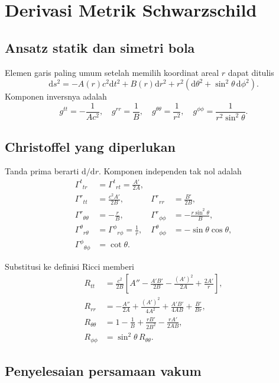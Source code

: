 \documentclass[12pt,a4paper]{report}
\newcommand{\dd}{\mathrm{d}}
\begin{document}
\chapter{Derivasi Metrik Schwarzschild}

\section{Ansatz statik dan simetri bola}

Elemen garis paling umum setelah memilih koordinat areal $r$ dapat ditulis
\[
 \dd s^2=-A(r)c^2\dd t^2+B(r)\dd r^2
 +r^2(\dd\theta^2+\sin^2\theta\,\dd\phi^2).
\]
Komponen inversnya adalah
\[
 g^{tt}=-\frac{1}{A c^2},\quad
 g^{rr}=\frac1B,\quad
 g^{\theta\theta}=\frac1{r^2},\quad
 g^{\phi\phi}=\frac1{r^2\sin^2\theta}.
\]

\section{Christoffel yang diperlukan}

Tanda prima berarti $\dd/\dd r$. Komponen independen tak nol adalah
\begin{align}
 \Gamma^t{}_{tr}&=\Gamma^t{}_{rt}=\frac{A'}{2A},\\
 \Gamma^r{}_{tt}&=\frac{c^2A'}{2B},
 &\Gamma^r{}_{rr}&=\frac{B'}{2B},\\
 \Gamma^r{}_{\theta\theta}&=-\frac rB,
 &\Gamma^r{}_{\phi\phi}&=-\frac{r\sin^2\theta}{B},\\
 \Gamma^\theta{}_{r\theta}&=\Gamma^\phi{}_{r\phi}=\frac1r,
 &\Gamma^\theta{}_{\phi\phi}&=-\sin\theta\cos\theta,\\
 \Gamma^\phi{}_{\theta\phi}&=\cot\theta.
\end{align}

Substitusi ke definisi Ricci memberi
\begin{align}
 R_{tt}&=\frac{c^2}{2B}\left[
 A''-\frac{A'B'}{2B}-\frac{(A')^2}{2A}+\frac{2A'}r
 \right],\\
 R_{rr}&=-\frac{A''}{2A}+\frac{(A')^2}{4A^2}
 +\frac{A'B'}{4AB}+\frac{B'}{Br},\\
 R_{\theta\theta}&=1-\frac1B
 +\frac{rB'}{2B^2}-\frac{rA'}{2AB},\\
 R_{\phi\phi}&=\sin^2\theta\,R_{\theta\theta}.
\end{align}

\section{Penyelesaian persamaan vakum}
\end{document}
